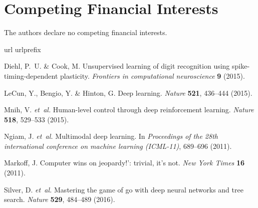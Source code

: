 \documentclass[journal, onecolumn]{IEEEtran}
\begin{document}
\section*{\large\bf{Competing Financial Interests}}
The authors declare no competing financial interests.










\begin{thebibliography}{10}
\expandafter\ifx\csname url\endcsname\relax
  \def\url#1{\texttt{#1}}\fi
\expandafter\ifx\csname urlprefix\endcsname\relax\def\urlprefix{URL }\fi
\providecommand{\bibinfo}[2]{#2}
\providecommand{\eprint}[2][]{\url{#2}}

\bibinfo{author}{Diehl, P.~U.} \& \bibinfo{author}{Cook, M.}
\newblock \bibinfo{title}{Unsupervised learning of digit recognition using
  spike-timing-dependent plasticity}.
\newblock \emph{\bibinfo{journal}{Frontiers in computational neuroscience}}
  \textbf{\bibinfo{volume}{9}} (\bibinfo{year}{2015}).

\bibinfo{author}{LeCun, Y.}, \bibinfo{author}{Bengio, Y.} \&
  \bibinfo{author}{Hinton, G.}
\newblock \bibinfo{title}{Deep learning}.
\newblock \emph{\bibinfo{journal}{Nature}} \textbf{\bibinfo{volume}{521}},
  \bibinfo{pages}{436--444} (\bibinfo{year}{2015}).

\bibinfo{author}{Mnih, V.} \emph{et~al.}
\newblock \bibinfo{title}{Human-level control through deep reinforcement
  learning}.
\newblock \emph{\bibinfo{journal}{Nature}} \textbf{\bibinfo{volume}{518}},
  \bibinfo{pages}{529--533} (\bibinfo{year}{2015}).

\bibinfo{author}{Ngiam, J.} \emph{et~al.}
\newblock \bibinfo{title}{Multimodal deep learning}.
\newblock In \emph{\bibinfo{booktitle}{Proceedings of the 28th international
  conference on machine learning (ICML-11)}}, \bibinfo{pages}{689--696}
  (\bibinfo{year}{2011}).

\bibinfo{author}{Markoff, J.}
\newblock \bibinfo{title}{Computer wins on jeopardy!’: trivial, it’s
  not}.
\newblock \emph{\bibinfo{journal}{New York Times}}
  \textbf{\bibinfo{volume}{16}} (\bibinfo{year}{2011}).

\bibinfo{author}{Silver, D.} \emph{et~al.}
\newblock \bibinfo{title}{Mastering the game of go with deep neural networks
  and tree search}.
\newblock \emph{\bibinfo{journal}{Nature}} \textbf{\bibinfo{volume}{529}},
  \bibinfo{pages}{484--489} (\bibinfo{year}{2016}).


\end{thebibliography}
\end{document}
